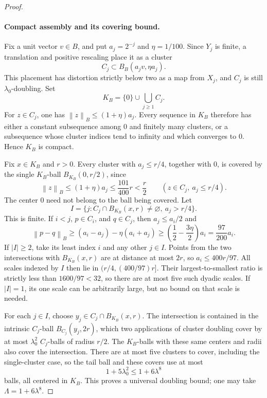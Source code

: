 \documentclass[11pt]{article}
\newcommand{\norm}[1]{\left\lVert#1\right\rVert}
\begin{document}
\begin{proof}
\paragraph{Compact assembly and its covering bound.}
Fix a unit vector $v\in B$, and put $a_j=2^{-j}$ and $\eta=1/100$. Since $Y_j$ is finite, a translation and positive rescaling place it as a cluster
\[
 C_j\subset B_B(a_jv,\eta a_j).
\]
This placement has distortion strictly below two as a map from $X_j$, and $C_j$ is still $\lambda_0$-doubling. Set
\[
 K_B=\{0\}\cup\bigcup_{j\ge1}C_j.
\]
For $z\in C_j$, one has $\norm z_B\le(1+\eta)a_j$. Every sequence in $K_B$ therefore has either a constant subsequence among $0$ and finitely many clusters, or a subsequence whose cluster indices tend to infinity and which converges to $0$. Hence $K_B$ is compact.

Fix $x\in K_B$ and $r>0$. Every cluster with $a_j\le r/4$, together with $0$, is covered by the single $K_B$-ball $B_{K_B}(0,r/2)$, since
\[
 \norm z_B\le(1+\eta)a_j\le\frac{101}{400}r<\frac r2
 \qquad(z\in C_j,\ a_j\le r/4).
\]
The center $0$ need not belong to the ball being covered. Let
\[
 I=\{j:C_j\cap B_{K_B}(x,r)\ne\varnothing,\ a_j>r/4\}.
\]
This is finite. If $i<j$, $p\in C_i$, and $q\in C_j$, then $a_j\le a_i/2$ and
\[
 \norm{p-q}_B
 \ge(a_i-a_j)-\eta(a_i+a_j)
 \ge\left(\frac12-\frac{3\eta}{2}\right)a_i
 =\frac{97}{200}a_i.
\]
If $|I|\ge2$, take its least index $i$ and any other $j\in I$. Points from the two intersections with $B_{K_B}(x,r)$ are at distance at most $2r$, so $a_i\le400r/97$. All scales indexed by $I$ then lie in $(r/4,(400/97)r]$. Their largest-to-smallest ratio is strictly less than $1600/97<32$, so there are at most five such dyadic scales. If $|I|=1$, its one scale can be arbitrarily large, but no bound on that scale is needed.

For each $j\in I$, choose $y_j\in C_j\cap B_{K_B}(x,r)$. The intersection is contained in the intrinsic $C_j$-ball $B_{C_j}(y_j,2r)$, which two applications of cluster doubling cover by at most $\lambda_0^2$ $C_j$-balls of radius $r/2$. The $K_B$-balls with these same centers and radii also cover the intersection. There are at most five clusters to cover, including the single-cluster case, so the tail ball and these covers use at most
\[
 1+5\lambda_0^2\le1+6\lambda^8
\]
balls, all centered in $K_B$. This proves a universal doubling bound; one may take $\Lambda=1+6\lambda^8$.


\end{proof}
\end{document}
